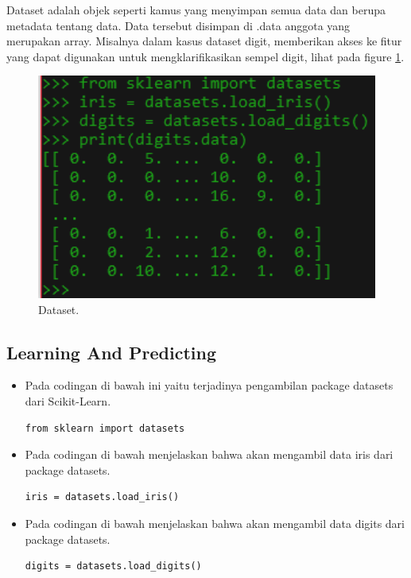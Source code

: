\begin{enumerate}
\subitem
Dataset adalah objek seperti kamus yang menyimpan semua data dan berupa metadata tentang data. Data tersebut disimpan di .data anggota yang merupakan array. Misalnya dalam kasus dataset digit, memberikan akses ke fitur yang dapat digunakan untuk mengklarifikasikan sempel digit, lihat pada figure \ref{gambarYN5}.

\begin{figure}[ht]
\centerline{\includegraphics[width=1\textwidth]{figures/36.PNG}}
\caption{Dataset.}
\label{gambarYN5}
\end{figure}

\subsection{Learning And Predicting}
\begin{itemize}

\item Pada codingan di bawah ini yaitu terjadinya pengambilan package datasets dari Scikit-Learn.
\begin{verbatim}
from sklearn import datasets
\end{verbatim}

\item Pada codingan di bawah menjelaskan bahwa akan mengambil data iris dari package datasets.
\begin{verbatim}
iris = datasets.load_iris()
\end{verbatim}

\item Pada codingan di bawah menjelaskan bahwa akan mengambil data digits dari package datasets.
\begin{verbatim}
digits = datasets.load_digits()
\end{verbatim}


\end{itemize}
\end{enumerate}
